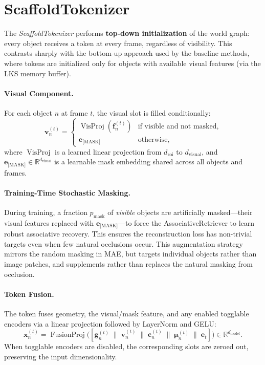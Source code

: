 \documentclass{article}
\newcommand{\mR}{\mathbb{R}}
\newcommand{\op}[1]{\operatorname{#1}}
\newcommand{\mat}[1]{\bm{#1}}
\begin{document}
\section{ScaffoldTokenizer}
\label{sec:tokenizer}

The \emph{ScaffoldTokenizer} performs \textbf{top-down initialization} of the world graph: every object receives a token at every frame, regardless of visibility.  This contrasts sharply with the bottom-up approach used by the baseline methods, where tokens are initialized only for objects with available visual features (via the LKS memory buffer).

\paragraph{Visual Component.}  For each object $n$ at frame $t$, the visual slot is filled conditionally:
\begin{equation}
    \mat{v}_n^{(t)} = \begin{cases}
        \op{VisProj}(\mat{f}_n^{(t)}) & \text{if visible and not masked}, \\
        \mat{e}_{\text{[MASK]}} & \text{otherwise},
    \end{cases}
    \label{eq:vis_mask}
\end{equation}
where $\op{VisProj}$ is a learned linear projection from $d_{\text{roi}}$ to $d_{\text{visual}}$, and $\mat{e}_{\text{[MASK]}} \in \mR^{d_{\text{visual}}}$ is a learnable mask embedding shared across all objects and frames.

\paragraph{Training-Time Stochastic Masking.}  During training, a fraction $p_{\text{mask}}$ of \emph{visible} objects are artificially masked---their visual features replaced with $\mat{e}_{\text{[MASK]}}$---to force the AssociativeRetriever to learn robust associative recovery.  This ensures the reconstruction loss has non-trivial targets even when few natural occlusions occur.  This augmentation strategy mirrors the random masking in MAE, but targets individual objects rather than image patches, and supplements rather than replaces the natural masking from occlusion.

\paragraph{Token Fusion.}  The token fuses geometry, the visual/mask feature, and any enabled togglable encoders via a linear projection followed by LayerNorm and GELU:
\begin{equation}
    \mat{x}_n^{(t)} = \op{FusionProj}\bigl([\mat{g}_n^{(t)} \;\|\; \mat{v}_n^{(t)} \;\|\; \mat{c}_n^{(t)} \;\|\; \mat{\mu}_n^{(t)} \;\|\; \mat{e}_t]\bigr) \in \mR^{d_{\text{model}}}.
    \label{eq:tokenizer}
\end{equation}
When togglable encoders are disabled, the corresponding slots are zeroed out, preserving the input dimensionality.
\end{document}
